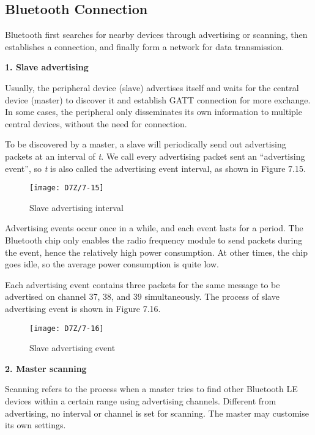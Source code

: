 \documentclass[a4paper,12pt]{book}
\begin{document}
\subsection{Bluetooth Connection}
Bluetooth first searches for nearby devices through advertising or scanning, then establishes a connection, and finally form a network for data transmission.

\textbf{1. Slave advertising}

Usually, the peripheral device (slave) advertises itself and waits for the central device (master) to discover it and establish GATT connection for more exchange. In some cases, the peripheral only disseminates its own information to multiple central devices, without the need for connection.

To be discovered by a master, a slave will periodically send out advertising packets at an interval of \textit{t}. We call every advertising packet sent an “advertising event”, so \textit{t} is also called the advertising event interval, as shown in Figure 7.15.

\begin{figure}[!h]
    \centering
    \texttt{[image: D7Z/7-15]}
    \caption{Slave advertising interval}
\end{figure}

Advertising events occur once in a while, and each event lasts for a period. The Bluetooth chip only enables the radio frequency module to send packets during the event, hence the relatively high power consumption. At other times, the chip goes idle, so the average power consumption is quite low.

Each advertising event contains three packets for the same message to be advertised on channel 37, 38, and 39 simultaneously. The process of slave advertising event is shown in Figure 7.16.

\begin{figure}[!h]
    \centering
    \texttt{[image: D7Z/7-16]}
    \caption{Slave advertising event}
\end{figure}

\textbf{2. Master scanning}

Scanning refers to the process when a master tries to find other Bluetooth LE devices within a certain range using advertising channels. Different from advertising, no interval or channel is set for scanning. The master may customise its own settings.
\end{document}
